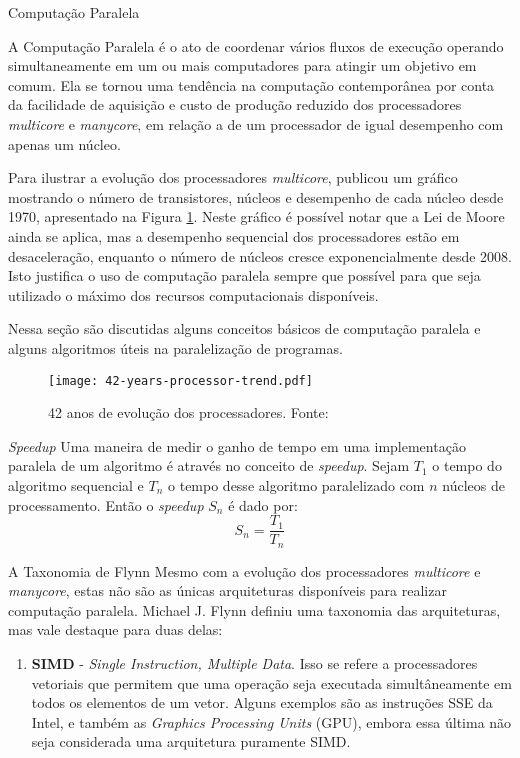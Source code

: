 \begin{section}{Computação Paralela}
\label{sec:parallel_comp}

    A Computação Paralela é o ato de coordenar vários fluxos de
execução operando simultaneamente em um ou mais computadores para
atingir um objetivo em comum. Ela se tornou uma tendência na
computação contemporânea por conta da facilidade de aquisição e custo de produção reduzido dos processadores \textit{multicore}
e \textit{manycore}, em relação a de um processador de igual desempenho com apenas um núcleo.

    Para ilustrar a evolução dos processadores \textit{multicore}, \cite{42years}
    publicou um gráfico mostrando o número
de transistores, núcleos e desempenho de cada núcleo desde 1970,
apresentado na Figura \ref{fig:42years}.
Neste gráfico é possível notar que a Lei de Moore ainda se aplica,
mas a desempenho sequencial dos processadores estão em desaceleração,
enquanto o número de núcleos cresce exponencialmente desde 2008. Isto
justifica o uso de computação paralela sempre que possível para que
seja utilizado o máximo dos recursos computacionais disponíveis.

    Nessa seção são discutidas alguns conceitos básicos de computação
paralela e alguns algoritmos úteis na paralelização de programas.

\begin{figure}[ht]
 \centering
 \texttt{[image: 42-years-processor-trend.pdf]}
 \caption{42 anos de evolução dos processadores. Fonte: \cite{42years}}
 \label{fig:42years}
\end{figure}

\begin{subsection}{\textit{Speedup}}
    Uma maneira de medir o ganho de tempo em uma implementação paralela
de um algoritmo é através no conceito de \textit{speedup}. Sejam $T_1$
o tempo do algoritmo sequencial e $T_n$ o tempo desse algoritmo paralelizado
    com $n$ núcleos de processamento. Então o \textit{speedup} $S_n$
é dado por:
    $$ S_n = \frac{T_1}{T_n} $$

\end{subsection}


\begin{subsection}{A Taxonomia de Flynn}
	Mesmo com a evolução dos processadores \textit{multicore} e
\textit{manycore}, estas não são as únicas arquiteturas disponíveis para
realizar computação paralela. Michael J. Flynn \citep{pacheco:2011} definiu
uma taxonomia das arquiteturas, mas vale destaque para duas delas:
\begin{enumerate}
    \item \textbf{SIMD} - \textit{Single Instruction, Multiple Data}. Isso se refere
        a processadores vetoriais que permitem que uma operação seja executada simultâneamente em
        todos os elementos de um vetor. Alguns exemplos são as
        instruções SSE da Intel, e também as \textit{Graphics Processing Units} (GPU),
        embora essa última não seja considerada uma arquitetura puramente SIMD.


\end{enumerate}
\end{subsection}
\end{section}
